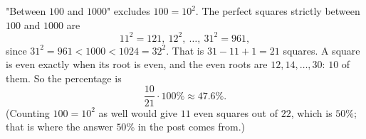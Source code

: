 "Between $100$ and $1000$" excludes $100=10^2$. The perfect squares strictly between $100$ and $1000$ are
\[
11^2=121,\ 12^2,\ \dots,\ 31^2=961,
\]
since $31^2=961<1000<1024=32^2$. That is $31-11+1=21$ squares. A square is even exactly when its root is even, and the even roots are $12,14,\dots,30$: $10$ of them. So the percentage is
\[
\dfrac{10}{21}\cdot100\%\approx\boxed{47.6\%}.
\]
(Counting $100=10^2$ as well would give $11$ even squares out of $22$, which is $50\%$; that is where the answer $50\%$ in the post comes from.)
